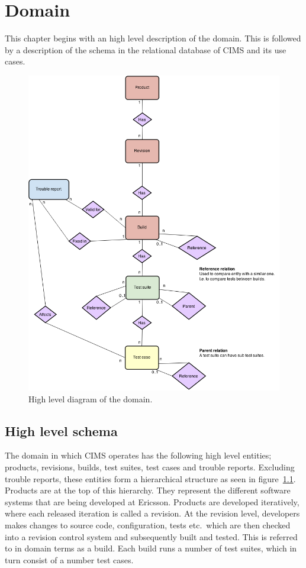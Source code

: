 \chapter{Domain}
\label{chap:domain}

This chapter begins with an high level description of the domain. This is followed by a description of the schema in the relational database of CIMS and its use cases.
\begin{figure}[h!]
\centering
\includegraphics[scale=0.5]{figure/er_diagram.png}
\caption{High level diagram of the domain.}
\label{fig:er}
\end{figure}

\section{High level schema}
The domain in which CIMS operates has the following high level entities; products, revisions, builds, test suites, test cases and trouble reports. Excluding trouble reports, these entities form a hierarchical structure as seen in figure~\ref{fig:er}. Products are at the top of this hierarchy. They represent the different software systems that are being developed at Ericsson. Products are developed iteratively, where each released iteration is called a revision. At the revision level, developers makes changes to source code, configuration, tests etc.\ which are then checked into a revision control system and subsequently built and tested. This is referred to in domain terms as a build. Each build runs a number of test suites, which in turn consist of a number test cases.

